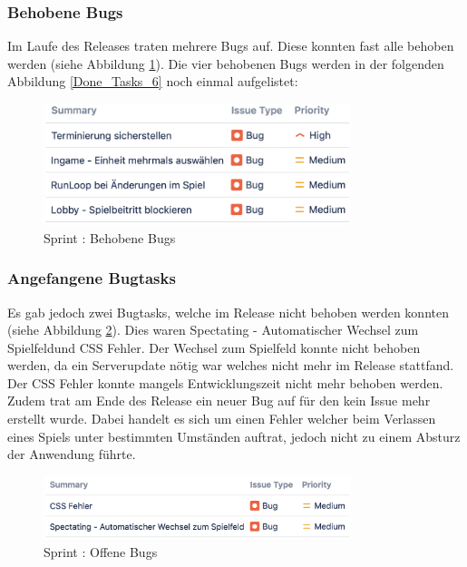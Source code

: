 \documentclass[12pt, titlepage]{scrartcl}
\newcommand{\RN}[1]{%
	\textup{\uppercase\expandafter{\romannumeral#1}}%
}
\begin{document}
    		\subsubsection{Behobene Bugs}
    			Im Laufe des Releases traten mehrere Bugs auf. Diese konnten fast alle behoben werden (siehe Abbildung \ref{Fixed_Bugs_6}). Die vier behobenen Bugs werden in der folgenden Abbildung \ref{Done_Tasks_6} noch einmal aufgelistet:
    			\begin{figure}[H]
    				\centering
    				\includegraphics[width=0.8\textwidth]{images/sprintVI/fixedBugs.png}
    				\caption{Sprint \RN{6}: Behobene Bugs}
    				\label{Fixed_Bugs_6}
    			\end{figure}
    		\subsubsection{Angefangene Bugtasks}
    			Es gab jedoch zwei Bugtasks, welche im Release \RN{3} nicht behoben werden konnten (siehe Abbildung \ref{Open_Bugs_6}). Dies waren \glqq Spectating - Automatischer Wechsel zum Spielfeld\grqq und \glqq CSS Fehler\grqq. Der Wechsel zum Spielfeld konnte nicht behoben werden, da ein Serverupdate n\"otig war welches nicht mehr im Release \RN{3} stattfand. Der CSS Fehler konnte mangels Entwicklungszeit nicht mehr behoben werden. Zudem trat am Ende des Release \RN{3} ein neuer Bug auf f\"ur den kein Issue mehr erstellt wurde. Dabei handelt es sich um einen Fehler welcher beim Verlassen eines Spiels unter bestimmten Umst\"anden auftrat, jedoch nicht zu einem Absturz der Anwendung f\"uhrte.
    			\begin{figure}[H]
    				\centering
    				\includegraphics[width=0.8\textwidth]{images/sprintVI/openBugs.png}
    				\caption{Sprint \RN{6}: Offene Bugs}
    				\label{Open_Bugs_6}
    			\end{figure}
\end{document}
